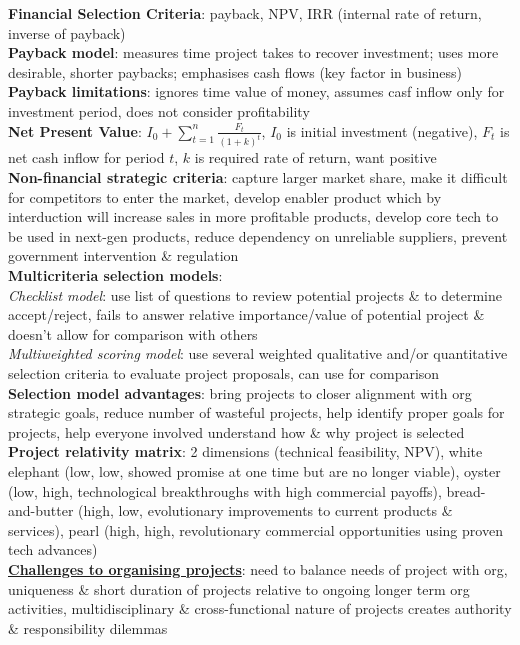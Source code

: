 \documentclass[a4paper]{article}
\begin{document}
\begin{multicols}{3}
        \textbf{Financial Selection Criteria}: payback, NPV, IRR (internal rate of return, inverse of payback)\\
        \textbf{Payback model}: measures time project takes to recover investment; uses more desirable, shorter paybacks; emphasises cash flows (key factor in business)\\
        \textbf{Payback limitations}: ignores time value of money, assumes casf inflow only for investment period, does not consider profitability\\
        \textbf{Net Present Value}: $I_0 + \sum\nolimits_{t=1}^n\frac{F_t}{{(1 + k)}^t}$, $I_0$ is initial investment (negative), $F_t$ is net cash inflow for period $t$, $k$ is required rate of return, want positive\\
        \textbf{Non-financial strategic criteria}: capture larger market share, make it difficult for competitors to enter the market, develop enabler product which by interduction will increase sales in more profitable products, develop core tech to be used in next-gen products, reduce dependency on unreliable suppliers, prevent government intervention \& regulation\\
        \textbf{Multicriteria selection models}:\\
        \textit{Checklist model}: use list of questions to review potential projects \& to determine accept/reject, fails to answer relative importance/value of potential project \& doesn't allow for comparison with others\\
        \textit{Multiweighted scoring model}: use several weighted qualitative and/or quantitative selection criteria to evaluate project proposals, can use for comparison\\
        \textbf{Selection model advantages}: bring projects to closer alignment with org strategic goals, reduce number of wasteful projects, help identify proper goals for projects, help everyone involved understand how \& why project is selected\\
        \textbf{Project relativity matrix}: 2 dimensions (technical feasibility, NPV), white elephant (low, low, showed promise at one time but are no longer viable), oyster (low, high, technological breakthroughs with high commercial payoffs), bread-and-butter (high, low, evolutionary improvements to current products \& services), pearl (high, high, revolutionary commercial opportunities using proven tech advances)\\
        \underline{\textbf{Challenges to organising projects}}: need to balance needs of project with org, uniqueness \& short duration of projects relative to ongoing longer term org activities, multidisciplinary \& cross-functional nature of projects creates authority \& responsibility dilemmas\\

\end{multicols}
\end{document}
